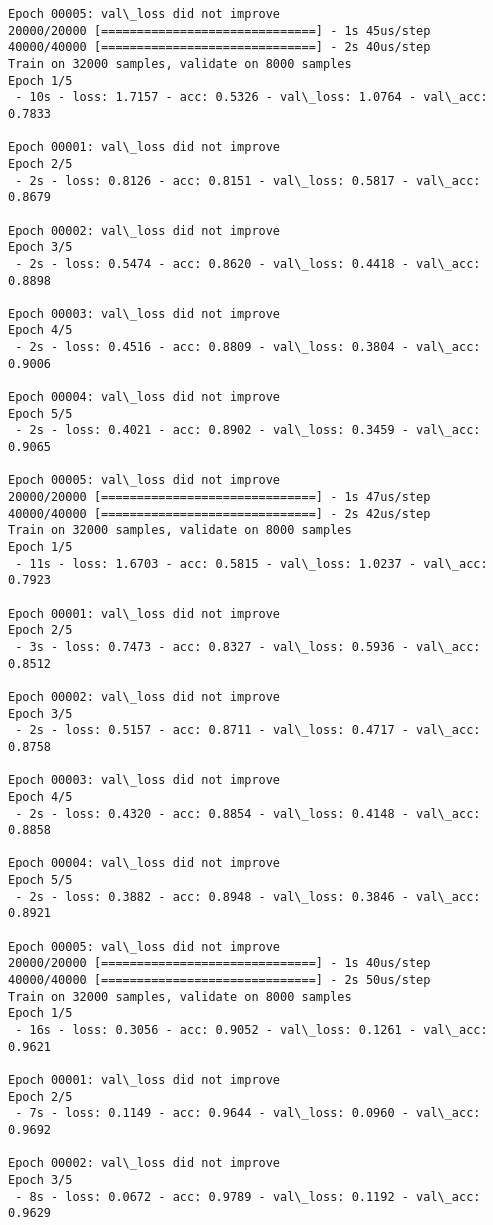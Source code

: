 \documentclass[11pt]{article}
\begin{document}
\begin{Verbatim}[commandchars=\\\{\}]
Epoch 00005: val\_loss did not improve
20000/20000 [==============================] - 1s 45us/step
40000/40000 [==============================] - 2s 40us/step
Train on 32000 samples, validate on 8000 samples
Epoch 1/5
 - 10s - loss: 1.7157 - acc: 0.5326 - val\_loss: 1.0764 - val\_acc: 0.7833

Epoch 00001: val\_loss did not improve
Epoch 2/5
 - 2s - loss: 0.8126 - acc: 0.8151 - val\_loss: 0.5817 - val\_acc: 0.8679

Epoch 00002: val\_loss did not improve
Epoch 3/5
 - 2s - loss: 0.5474 - acc: 0.8620 - val\_loss: 0.4418 - val\_acc: 0.8898

Epoch 00003: val\_loss did not improve
Epoch 4/5
 - 2s - loss: 0.4516 - acc: 0.8809 - val\_loss: 0.3804 - val\_acc: 0.9006

Epoch 00004: val\_loss did not improve
Epoch 5/5
 - 2s - loss: 0.4021 - acc: 0.8902 - val\_loss: 0.3459 - val\_acc: 0.9065

Epoch 00005: val\_loss did not improve
20000/20000 [==============================] - 1s 47us/step
40000/40000 [==============================] - 2s 42us/step
Train on 32000 samples, validate on 8000 samples
Epoch 1/5
 - 11s - loss: 1.6703 - acc: 0.5815 - val\_loss: 1.0237 - val\_acc: 0.7923

Epoch 00001: val\_loss did not improve
Epoch 2/5
 - 3s - loss: 0.7473 - acc: 0.8327 - val\_loss: 0.5936 - val\_acc: 0.8512

Epoch 00002: val\_loss did not improve
Epoch 3/5
 - 2s - loss: 0.5157 - acc: 0.8711 - val\_loss: 0.4717 - val\_acc: 0.8758

Epoch 00003: val\_loss did not improve
Epoch 4/5
 - 2s - loss: 0.4320 - acc: 0.8854 - val\_loss: 0.4148 - val\_acc: 0.8858

Epoch 00004: val\_loss did not improve
Epoch 5/5
 - 2s - loss: 0.3882 - acc: 0.8948 - val\_loss: 0.3846 - val\_acc: 0.8921

Epoch 00005: val\_loss did not improve
20000/20000 [==============================] - 1s 40us/step
40000/40000 [==============================] - 2s 50us/step
Train on 32000 samples, validate on 8000 samples
Epoch 1/5
 - 16s - loss: 0.3056 - acc: 0.9052 - val\_loss: 0.1261 - val\_acc: 0.9621

Epoch 00001: val\_loss did not improve
Epoch 2/5
 - 7s - loss: 0.1149 - acc: 0.9644 - val\_loss: 0.0960 - val\_acc: 0.9692

Epoch 00002: val\_loss did not improve
Epoch 3/5
 - 8s - loss: 0.0672 - acc: 0.9789 - val\_loss: 0.1192 - val\_acc: 0.9629


\end{Verbatim}
\end{document}
